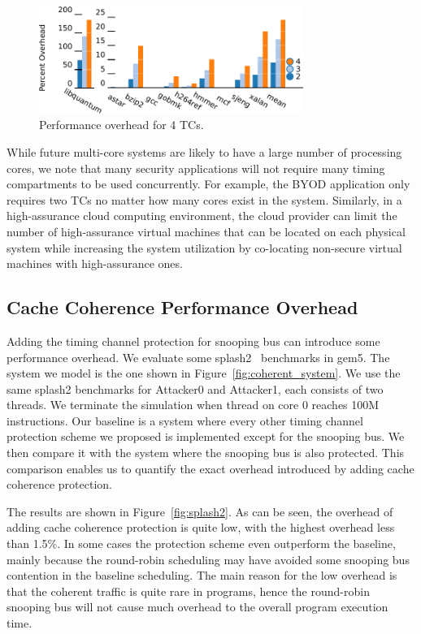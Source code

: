 \begin{figure}
    \begin{center}
        \includegraphics[width=3.4in]{figs/scalability_split.pdf}
        \caption{Performance overhead for 4 TCs.}
        \label{fig:scalability}
    \end{center}
\end{figure}

While future multi-core systems are likely to have a large number of processing 
cores, we note that many security applications will not require many timing 
compartments to be used concurrently. For example, the BYOD application only 
requires two TCs no matter how many cores exist in the system. Similarly, in 
a high-assurance cloud computing environment, the cloud provider can limit the
number of high-assurance virtual machines that can be located on each physical
system while increasing the system utilization by co-locating non-secure
virtual machines with high-assurance ones.

\subsection{Cache Coherence Performance Overhead}
Adding the timing channel protection for snooping bus can introduce some performance overhead. We evaluate some 
splash2~\cite{splash2} benchmarks in gem5. The system we model is the one shown in Figure~\ref{fig:coherent_system}.
We use the same splash2 benchmarks for Attacker0 and Attacker1, each consists of two threads. We terminate the simulation
when thread on core 0 reaches 100M instructions. 
Our baseline is a system where every other timing channel protection scheme we proposed is implemented except for the snooping bus.
We then compare it with the system where the snooping bus is also protected. This comparison enables us to quantify the exact overhead introduced by adding cache coherence protection. 

The results are shown in Figure~\ref{fig:splash2}. As can be seen, the overhead of adding cache coherence protection is
quite low, with the highest overhead less than 1.5\%. In some cases the protection scheme even outperform the baseline, 
mainly because the round-robin scheduling may have avoided some snooping bus contention in the baseline scheduling. 
The main reason for the low overhead is that the coherent traffic is quite rare in programs, hence the round-robin
snooping bus will not cause much overhead to the overall program execution time.

